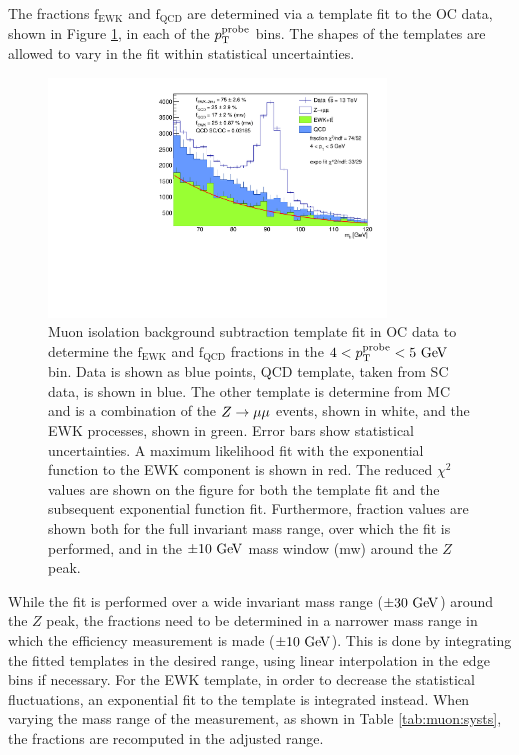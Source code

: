 The fractions $\text{f}_\text{EWK}$ and $\text{f}_\text{QCD}$ are
determined via a template fit to the OC data, shown in Figure
\ref{fig:muon:fit}, in each of the $p_{\text{T}}^\text{probe}$ bins.
The shapes of the templates are allowed to vary in the fit within
statistical uncertainties.
\begin{figure}[h!]
  \centering
  \includegraphics[width=0.8\textwidth]{figures/muons/fit}
  \caption[Muon isolation background subtraction fit.]{Muon isolation
  background subtraction template fit in OC data to determine the
  $\text{f}_\text{EWK}$ and $\text{f}_\text{QCD}$ fractions in the
  $4 < p_{\text{T}}^\text{probe} < 5~\text{Ge\kern -0.1em V}$ bin.
  Data is shown as blue points, QCD template, taken from SC data, is
  shown in blue. The other template is determine from MC and is a
  combination of the $Z \rightarrow \mu\mu$ events, shown in white, and the EWK
  processes, shown in green. Error bars show statistical
  uncertainties. A maximum likelihood fit with the exponential
  function to the EWK component is shown in red. The reduced $\chi^2$
  values are shown on the figure for both the template fit and the
  subsequent exponential function fit. Furthermore, fraction values
  are shown both for the full invariant mass range, over which the
  fit is performed, and in the $\pm 10~\text{Ge\kern -0.1em V}$ mass window (mw) around
  the $Z$ peak.}
  \label{fig:muon:fit}
\end{figure}
While the fit is performed over a wide invariant mass range ($\pm30~\text{Ge\kern -0.1em V}$)
around the $Z$ peak, the fractions need to be determined in a narrower
mass range in which the efficiency measurement is made ($\pm10~\text{Ge\kern -0.1em V}$).
This is done by integrating the fitted templates in the desired range,
using linear interpolation in the edge bins if necessary. For the EWK template, in
order to decrease the statistical fluctuations, an exponential fit
to the template is integrated instead. When varying the mass range
of the measurement, as shown in Table \ref{tab:muon:systs}, the fractions
are recomputed in the adjusted range.

